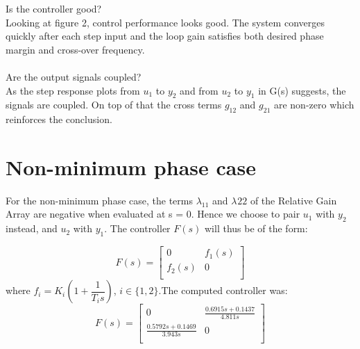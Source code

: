 \documentclass[a4paper,11pt]{article}
\begin{document}
	Is the controller good?
	\\Looking at figure 2, control performance looks good. The system converges quickly after each step input and the loop gain satisfies both desired phase margin and cross-over frequency.\\\\
	Are the output signals coupled?\\
	As the step response plots from $u_1$ to $y_2$ and from $u_2$ to $y_1$ in G(s) suggests, the signals are coupled. On top of that the cross terms $g_{12}$ and $g_{21}$ are non-zero which reinforces the conclusion. 

	\section*{Non-minimum phase case}

    For the non-minimum phase case, the terms $\lambda_{11}$ and  $\lambda_{}22$ of the Relative Gain Array are negative when evaluated at s = 0. Hence we choose to pair $u_1$ with $y_2$ instead, and $u_2$ with $y_1$. The controller $F(s)$ will thus be of the form:

    \[
    F(s)=
    \begin{bmatrix}
      0 & f_1(s)      \\
      f_2(s)      & 0 \\
    \end{bmatrix}
    \]
    where $f_i = K_i (1 + \dfrac{1}{T_i s})$, $i \in \{1,2\}$.The computed controller was:
    \[
    F(s)=
    \begin{bmatrix}
     0 & \frac{0.6915s + 0.1437}{4.811s}      \\
      \frac{0.5792s + 0.1469}{3.943s}      & 0 \\
    \end{bmatrix}
    \]
\end{document}
